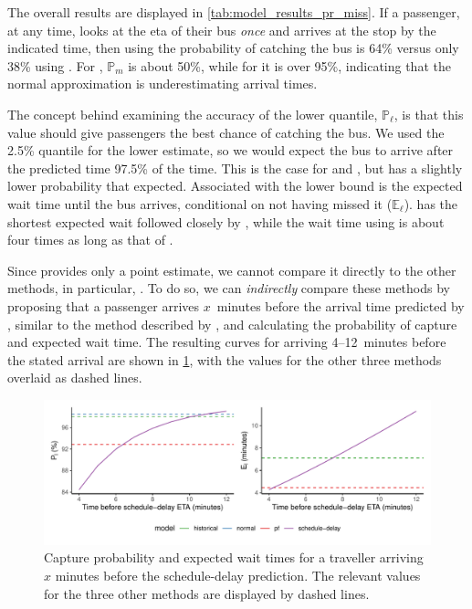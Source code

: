 The overall results are displayed in \cref{tab:model_results_pr_miss}. If a passenger, at any time, looks at the \gls{eta} of their bus \emph{once} and arrives at the stop by the indicated time, then using \Fpf{} the probability of catching the bus is 64\% versus only 38\% using \Fsched{}. For \Fhist{}, $\mathbb{P}_m$ is about 50\%, while for \Fnorm{} it is over 95\%, indicating that the normal approximation is underestimating arrival times.


The concept behind examining the accuracy of the lower quantile, $\mathbb{P}_\ell$, is that this value should give passengers the best chance of catching the bus. We used the 2.5\% quantile for the lower estimate, so we would expect the bus to arrive after the predicted time 97.5\% of the time. This is the case for \Fnorm{} and \Fhist{}, but \Fpf{} has a slightly lower probability that expected. Associated with the lower bound is the expected wait time until the bus arrives, conditional on not having missed it ($\mathbb{E}_\ell$). \Fpf{} has the shortest expected wait followed closely by \Fhist{}, while the wait time using \Fnorm{} is about four times as long as that of \Fpf{}.


Since \Fsched{} provides only a point estimate, we cannot compare it directly to the other methods, in particular, \Fpf{}. To do so, we can \emph{indirectly} compare these methods by proposing that a passenger arrives $x$~minutes before the arrival time predicted by \Fsched{}, similar to the method described by \citet{Cathey_2003}, and calculating the probability of capture and expected wait time. The resulting curves for arriving 4--12~minutes before the stated arrival are shown in \cref{fig:model_results_pr_gtfs}, with the values for the other three methods overlaid as dashed lines.


\begin{knitrout}\small
{}\color{fgcolor}\begin{figure}

{\centering \includegraphics[width=\textwidth]{figure/model_results_pr_gtfs-1} 

}

\caption[Capture probability and expected wait times for schedule-delay predictions]{Capture probability and expected wait times for a traveller arriving $x$ minutes before the schedule-delay prediction. The relevant values for the three other methods are displayed by dashed lines.}\label{fig:model_results_pr_gtfs}
\end{figure}


\end{knitrout}



